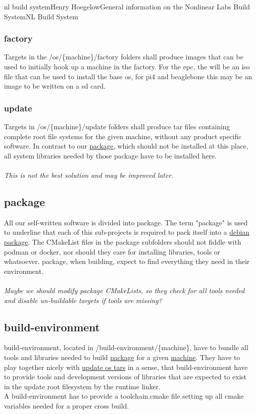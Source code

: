 \documentclass[11pt]{article}
\begin{document}
\begin{Name}{1}{nl build system}{Henry Hoegelow}{General information on the Nonlinear Labs Build System}{NL Build System}
\subsubsection{factory}
Targets in the /os/\{machine\}/factory folders shall produce images that can be used to initially hook up a machine in the factory. For the epc, the will be an iso file that can be used to install the base os, for pi4 and beaglebone this may be an image to be written on a sd card.

\subsubsection{update} \label{os-update}
Targets in /os/\{machine\}/update folders shall produce tar files containing complete root file systems for the given machine, without any product specific software. In contrast to our \hyperref[package]{package}, which should not be installed at this place, all system libraries needed by those package have to be installed here.\\
\\
\emph{This is not the best solution and may be improved later.}

\subsection{package} \label{package}
All our self-written software is divided into package. The term "package" is used to underline that each of this sub-projects is required to pack itself into a \hyperref[cmake-package]{debian package}. The CMakeList files in the package subfolders should not fiddle with podman or docker, nor should they care for installing libraries, tools or whatsoever. package, when building, expect to find everything they need in their environment.\\
\\
\emph{Maybe we should modify package CMakeLists, so they check for all tools needed and disable un-buildable targets if tools are missing?}

\subsection{build-environment} \label{buildenv}
build-environment, located in /build-environment/\{machine\}, have to bundle all tools and libraries needed to build \hyperref[package]{package} for a given \hyperref[machine]{machine}. They have to play together nicely with \hyperref[os-update]{update os tars} in a sense, that build-environment have to provide tools and development versions of libraries that are expected to exist in the update root filesystem by the runtime linker.\\
A build-environment has to provide a toolchain.cmake file setting up all cmake variables needed for a proper cross build.


\end{Name}
\end{document}
